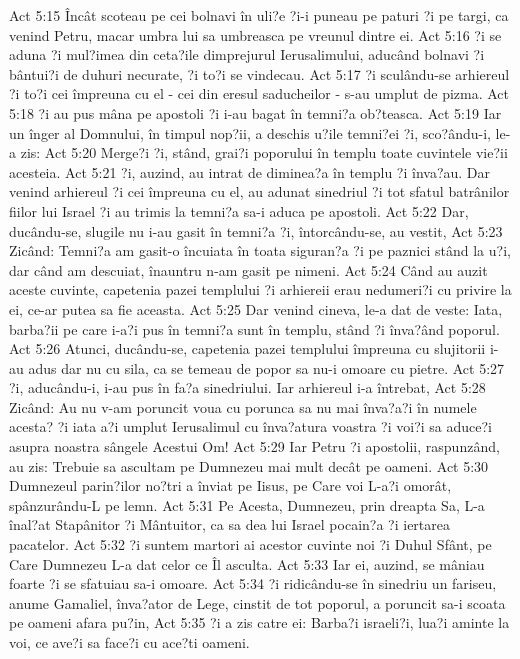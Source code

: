 Act 5:15  Încât scoteau pe cei bolnavi în uli?e ?i-i puneau pe paturi ?i pe targi, ca venind Petru, macar umbra lui sa umbreasca pe vreunul dintre ei.
Act 5:16  ?i se aduna ?i mul?imea din ceta?ile dimprejurul Ierusalimului, aducând bolnavi ?i bântui?i de duhuri necurate, ?i to?i se vindecau.
Act 5:17  ?i sculându-se arhiereul ?i to?i cei împreuna cu el - cei din eresul saducheilor - s-au umplut de pizma.
Act 5:18  ?i au pus mâna pe apostoli ?i i-au bagat în temni?a ob?teasca.
Act 5:19  Iar un înger al Domnului, în timpul nop?ii, a deschis u?ile temni?ei ?i, sco?ându-i, le-a zis:
Act 5:20  Merge?i ?i, stând, grai?i poporului în templu toate cuvintele vie?ii acesteia.
Act 5:21  ?i, auzind, au intrat de diminea?a în templu ?i înva?au. Dar venind arhiereul ?i cei împreuna cu el, au adunat sinedriul ?i tot sfatul batrânilor fiilor lui Israel ?i au trimis la temni?a sa-i aduca pe apostoli.
Act 5:22  Dar, ducându-se, slugile nu i-au gasit în temni?a ?i, întorcându-se, au vestit,
Act 5:23  Zicând: Temni?a am gasit-o încuiata în toata siguran?a ?i pe paznici stând la u?i, dar când am descuiat, înauntru n-am gasit pe nimeni.
Act 5:24  Când au auzit aceste cuvinte, capetenia pazei templului ?i arhiereii erau nedumeri?i cu privire la ei, ce-ar putea sa fie aceasta.
Act 5:25  Dar venind cineva, le-a dat de veste: Iata, barba?ii pe care i-a?i pus în temni?a sunt în templu, stând ?i înva?ând poporul.
Act 5:26  Atunci, ducându-se, capetenia pazei templului împreuna cu slujitorii i-au adus dar nu cu sila, ca se temeau de popor sa nu-i omoare cu pietre.
Act 5:27  ?i, aducându-i, i-au pus în fa?a sinedriului. Iar arhiereul i-a întrebat,
Act 5:28  Zicând: Au nu v-am poruncit voua cu porunca sa nu mai înva?a?i în numele acesta? ?i iata a?i umplut Ierusalimul cu înva?atura voastra ?i voi?i sa aduce?i asupra noastra sângele Acestui Om!
Act 5:29  Iar Petru ?i apostolii, raspunzând, au zis: Trebuie sa ascultam pe Dumnezeu mai mult decât pe oameni.
Act 5:30  Dumnezeul parin?ilor no?tri a înviat pe Iisus, pe Care voi L-a?i omorât, spânzurându-L pe lemn.
Act 5:31  Pe Acesta, Dumnezeu, prin dreapta Sa, L-a înal?at Stapânitor ?i Mântuitor, ca sa dea lui Israel pocain?a ?i iertarea pacatelor.
Act 5:32  ?i suntem martori ai acestor cuvinte noi ?i Duhul Sfânt, pe Care Dumnezeu L-a dat celor ce Îl asculta.
Act 5:33  Iar ei, auzind, se mâniau foarte ?i se sfatuiau sa-i omoare.
Act 5:34  ?i ridicându-se în sinedriu un fariseu, anume Gamaliel, înva?ator de Lege, cinstit de tot poporul, a poruncit sa-i scoata pe oameni afara pu?in,
Act 5:35  ?i a zis catre ei: Barba?i israeli?i, lua?i aminte la voi, ce ave?i sa face?i cu ace?ti oameni.
